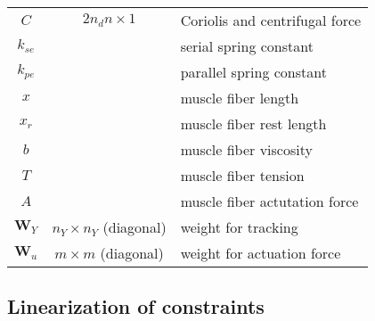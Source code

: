 \documentclass[a4paper,10pt]{article}
\begin{document}
\begin{table}[h!b!p!]
\begin{tabular}{ c c l }
$C$              & $2n_d n    \times 1$                     & Coriolis and centrifugal force\\
$k_{se}$         &                                          & serial spring constant\\
$k_{pe}$         &                                          & parallel spring constant\\
$x$              &                                          & muscle fiber length\\
$x_r$            &                                          & muscle fiber rest length\\
$b$              &                                          & muscle fiber viscosity\\
$T$              &                                          & muscle fiber tension\\
$A$              &                                          & muscle fiber actutation force\\
$\mathbf{W}_Y$   &     $n_Y \times n_Y$ (diagonal)   & weight for tracking\\
$\mathbf{W}_u$   &     $ m  \times  m $ (diagonal)   & weight for actuation force\\
\hline
\end{tabular}
\end{table}

\subsection{Linearization of constraints}
\end{document}
